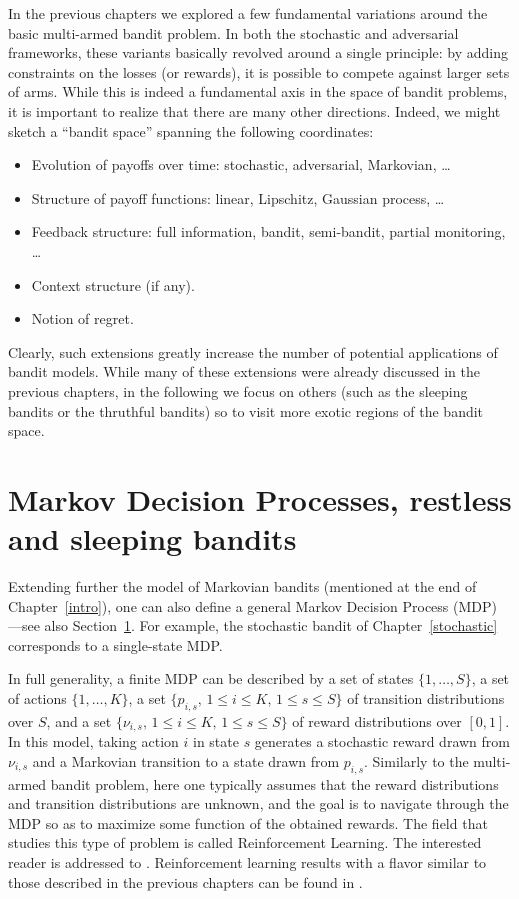 In the previous chapters we explored a few fundamental variations around the basic multi-armed bandit problem. In both the stochastic and adversarial frameworks, these variants basically revolved around a single principle: by adding constraints on the losses (or rewards), it is possible to compete against larger sets of arms. While this is indeed a fundamental axis in the space of bandit problems, it is important to realize that there are many other directions. Indeed, we might sketch a ``bandit space'' spanning the following coordinates:
\begin{itemize}
\item Evolution of payoffs over time: stochastic, adversarial, Markovian, \dots
\item Structure of payoff functions: linear, Lipschitz, Gaussian process, \dots
\item Feedback structure: full information, bandit, semi-bandit, partial monitoring, \dots
\item Context structure (if any).
\item Notion of regret.
\end{itemize}
Clearly, such extensions greatly increase the number of potential applications of bandit models. While many of these extensions were already discussed in the previous chapters, in the following we focus on others (such as the sleeping bandits or the thruthful bandits) so to visit more exotic regions of the bandit space.

\section{Markov Decision Processes, restless and sleeping bandits}
\label{s:mdp}
Extending further the model of Markovian bandits (mentioned at the end of Chapter~\ref{intro}), one can also define a general Markov Decision Process (MDP) ---see also Section~\ref{s:mdp}. For example, the stochastic bandit of Chapter~\ref{stochastic} corresponds to a single-state MDP.

In full generality, a finite MDP can be described by a set of states $\{1, \hdots, S\}$, a set of actions $\{1,\hdots, K\}$, a set $\{p_{i,s},\, 1 \leq i \leq K,\, 1 \leq s \leq S\}$ of transition distributions over $S$, and a set $\{\nu_{i,s},\, 1 \leq i \leq K,\, 1 \leq s \leq S\}$ of reward distributions over $[0,1]$. In this model, taking action $i$ in state $s$ generates a stochastic reward drawn from $\nu_{i,s}$ and a Markovian transition to a state drawn from $p_{i,s}$. Similarly to the multi-armed bandit problem, here one typically assumes that the reward distributions and transition distributions are unknown, and the goal is to navigate through the MDP so as to maximize some function of the obtained rewards. The field that studies this type of problem is called Reinforcement Learning. The interested reader is addressed to \cite{SB98, Kak03, Sze10}. Reinforcement learning results with a flavor similar to those described in the previous chapters can be found in \cite{YMS09, BM10, JOA10, NGSA10}.


